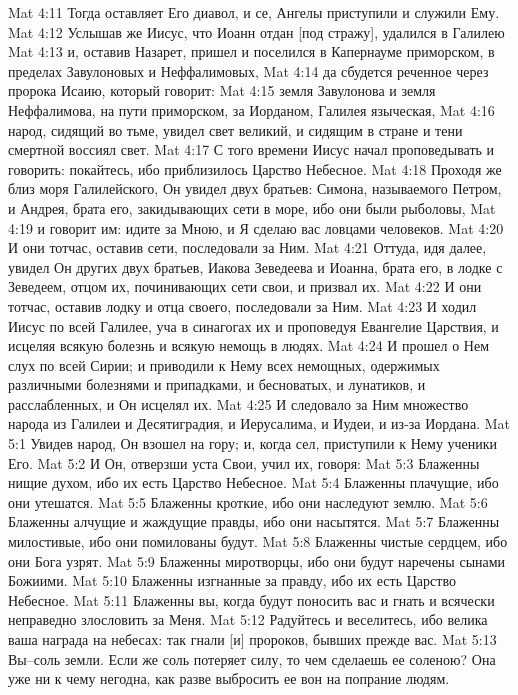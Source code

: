 Mat 4:11  Тогда оставляет Его диавол, и се, Ангелы приступили и служили Ему.
Mat 4:12  Услышав же Иисус, что Иоанн отдан [под стражу], удалился в Галилею
Mat 4:13  и, оставив Назарет, пришел и поселился в Капернауме приморском, в пределах Завулоновых и Неффалимовых,
Mat 4:14  да сбудется реченное через пророка Исаию, который говорит:
Mat 4:15  земля Завулонова и земля Неффалимова, на пути приморском, за Иорданом, Галилея языческая,
Mat 4:16  народ, сидящий во тьме, увидел свет великий, и сидящим в стране и тени смертной воссиял свет.
Mat 4:17  С того времени Иисус начал проповедывать и говорить: покайтесь, ибо приблизилось Царство Небесное.
Mat 4:18  Проходя же близ моря Галилейского, Он увидел двух братьев: Симона, называемого Петром, и Андрея, брата его, закидывающих сети в море, ибо они были рыболовы,
Mat 4:19  и говорит им: идите за Мною, и Я сделаю вас ловцами человеков.
Mat 4:20  И они тотчас, оставив сети, последовали за Ним.
Mat 4:21  Оттуда, идя далее, увидел Он других двух братьев, Иакова Зеведеева и Иоанна, брата его, в лодке с Зеведеем, отцом их, починивающих сети свои, и призвал их.
Mat 4:22  И они тотчас, оставив лодку и отца своего, последовали за Ним.
Mat 4:23  И ходил Иисус по всей Галилее, уча в синагогах их и проповедуя Евангелие Царствия, и исцеляя всякую болезнь и всякую немощь в людях.
Mat 4:24  И прошел о Нем слух по всей Сирии; и приводили к Нему всех немощных, одержимых различными болезнями и припадками, и бесноватых, и лунатиков, и расслабленных, и Он исцелял их.
Mat 4:25  И следовало за Ним множество народа из Галилеи и Десятиградия, и Иерусалима, и Иудеи, и из-за Иордана.
Mat 5:1  Увидев народ, Он взошел на гору; и, когда сел, приступили к Нему ученики Его.
Mat 5:2  И Он, отверзши уста Свои, учил их, говоря:
Mat 5:3  Блаженны нищие духом, ибо их есть Царство Небесное.
Mat 5:4  Блаженны плачущие, ибо они утешатся.
Mat 5:5  Блаженны кроткие, ибо они наследуют землю.
Mat 5:6  Блаженны алчущие и жаждущие правды, ибо они насытятся.
Mat 5:7  Блаженны милостивые, ибо они помилованы будут.
Mat 5:8  Блаженны чистые сердцем, ибо они Бога узрят.
Mat 5:9  Блаженны миротворцы, ибо они будут наречены сынами Божиими.
Mat 5:10  Блаженны изгнанные за правду, ибо их есть Царство Небесное.
Mat 5:11  Блаженны вы, когда будут поносить вас и гнать и всячески неправедно злословить за Меня.
Mat 5:12  Радуйтесь и веселитесь, ибо велика ваша награда на небесах: так гнали [и] пророков, бывших прежде вас.
Mat 5:13  Вы--соль земли. Если же соль потеряет силу, то чем сделаешь ее соленою? Она уже ни к чему негодна, как разве выбросить ее вон на попрание людям.
